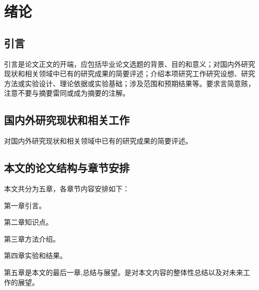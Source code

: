 
\chapter{绪论}
\label{cha:introduction}
\section{引言}
\label{sec:prologue}
引言是论文正文的开端，应包括毕业论文选题的背景、目的和意义；对国内外研究现状和相关领域中已有的研究成果的简要评述；介绍本项研究工作研究设想、研究方法或实验设计、理论依据或实验基础；涉及范围和预期结果等。要求言简意赅，注意不要与摘要雷同或成为摘要的注解。

\section{国内外研究现状和相关工作}
\label{sec:related_work}
对国内外研究现状和相关领域中已有的研究成果的简要评述。

\section{本文的论文结构与章节安排}
\label{sec:arrangement}
本文共分为五章，各章节内容安排如下：

第一章引言。

第二章知识点。

第三章方法介绍。

第四章实验和结果。

第五章是本文的最后一章,总结与展望。是对本文内容的整体性总结以及对未来工作的展望。

